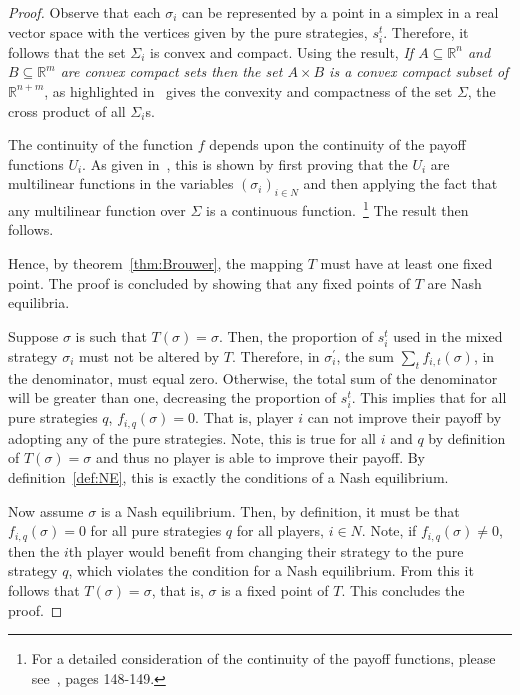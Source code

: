 \begin{proof}
    Observe that each \(\sigma_{i}\) can be represented by a point in a simplex
    in a real vector space with the vertices given by the pure strategies,
    \(s_{i}^{t}\). Therefore, it follows that the set \(\Sigma_{i}\) is convex
    and compact. Using the result, \textit{If \(A \subseteq \mathbb{R}^{n}\) and
    \(B \subseteq \mathbb{R}^{m}\) are convex compact sets then the set \(A
    \times B\) is a convex compact subset of \(\mathbb{R}^{n+m}\)}, as
    highlighted in~\cite{maschler_solan_zamir_2013} gives the convexity and
    compactness of the set \(\Sigma\), the cross product of all \(\Sigma_{i}\)s.
    
    The continuity of the function \(f\) depends upon the continuity of the
    payoff functions \(U_{i}\). As given in~\cite{maschler_solan_zamir_2013},
    this is shown by first proving that the \(U_{i}\) are multilinear functions
    in the variables \((\sigma_{i})_{i \in N}\) and then applying the fact that
    any multilinear function over \(\Sigma\) is a continuous
    function.~\footnote{For a detailed consideration of the continuity of the
    payoff functions, please see~\cite{maschler_solan_zamir_2013}, pages
    148-149.} The result then follows.

    Hence, by theorem~\ref{thm:Brouwer}, the mapping \(T\) must have at least
    one fixed point. The proof is concluded by showing that any fixed points of
    \(T\) are Nash equilibria. 

    Suppose \(\sigma\) is such that \(T(\sigma) = \sigma\). Then, the proportion
    of \(s_{i}^{t}\) used in the mixed strategy \(\sigma_{i}\) must not be
    altered by \(T\). Therefore, in \(\sigma_{i}^{\prime}\), the sum
    \(\sum_{t}{f_{i,t}(\sigma)}\), in the denominator, must equal zero.
    Otherwise, the total sum of the denominator will be greater than one,
    decreasing the proportion of \(s_{i}^{t}\). This implies that for all pure
    strategies \(q\), \(f_{i,q}(\sigma)=0\). That is, player \(i\) can not
    improve their payoff by adopting any of the pure strategies. Note, this is
    true for all \(i\) and \(q\) by definition of \(T(\sigma) = \sigma\) and
    thus no player is able to improve their payoff. By definition~\ref{def:NE},
    this is exactly the conditions of a Nash equilibrium.

    Now assume \(\sigma\) is a Nash equilibrium. Then, by definition, it must be
    that \(f_{i,q}(\sigma)=0\) for all pure strategies \(q\) for all players,
    \(i \in N\). Note, if \(f_{i,q}(\sigma) \ne 0\), then the
    \(i\)th player would benefit from changing their strategy to the pure
    strategy \(q\), which violates the condition for a Nash equilibrium. From
    this it follows that \(T(\sigma) = \sigma\), that is, \(\sigma\) is a fixed
    point of \(T\). This concludes the proof.

\end{proof}

